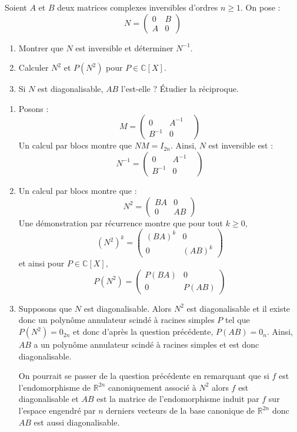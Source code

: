 \documentclass[a4paper,10pt]{report}
\begin{document}
\begin{Exa} Soient $A$ et $B$ deux matrices complexes inversibles d'ordres $n \geq 1$. On pose :
$$ N = \begin{pmatrix}
0 & B \\
A & 0
\end{pmatrix}$$
\begin{enumerate}
\item Montrer que $N$ est inversible et déterminer $N^{-1}$.
\item Calculer $N^2$ et $P(N^2)$ pour $P \in \mathbb{C}[X]$.
\item Si $N$ est diagonalisable, $AB$ l'est-elle ? Étudier la réciproque.
\end{enumerate}
\end{Exa}

\corr \begin{enumerate}
\item Posons :
$$ M = \begin{pmatrix}
0 & A^{-1} \\
B^{-1} & 0& 
\end{pmatrix}$$
Un calcul par blocs montre que $NM=I_{2n}$. Ainsi, $N$ est inversible est :
$$ N^{-1} = \begin{pmatrix}
0 & A^{-1} \\
B^{-1} & 0& 
\end{pmatrix}$$
\item Un calcul par blocs montre que :
$$ N^{2} = \begin{pmatrix}
BA & 0 \\
0 & AB
\end{pmatrix}$$
Une démonstration par récurrence montre que pour tout $k \geq 0$,
$$ (N^2)^k =  \begin{pmatrix}
(BA)^k & 0 \\
0 & (AB)^k
\end{pmatrix}$$
et ainsi pour $P \in \mathbb{C}[X]$, 
$$ P(N^2) = \begin{pmatrix}
P(BA) & 0 \\
0 & P(AB) 
\end{pmatrix}$$
\item Supposons que $N$ est diagonalisable. Alors $N^2$ est diagonalisable et il existe donc un polynôme annulateur scindé à racines simples $P$ tel que $P(N^2)=0_{2n}$ et donc d'après la question précédente, $P(AB)=0_n$. Ainsi, $AB$ a un polynôme annulateur scindé à racines simples et est donc diagonalisable.

\medskip

\noindent On pourrait se passer de la question précédente en remarquant que si $f$ est l'endomorphisme de $\mathbb{R}^{2n}$ canoniquement associé à $N^2$ alors $f$ est diagonalisable et $AB$ est la matrice de l'endomorphisme induit par $f$ sur l'espace engendré par $n$ derniers vecteurs de la base canonique de $\mathbb{R}^{2n}$ donc $AB$ est aussi diagonalisable.


\end{enumerate}
\end{document}
